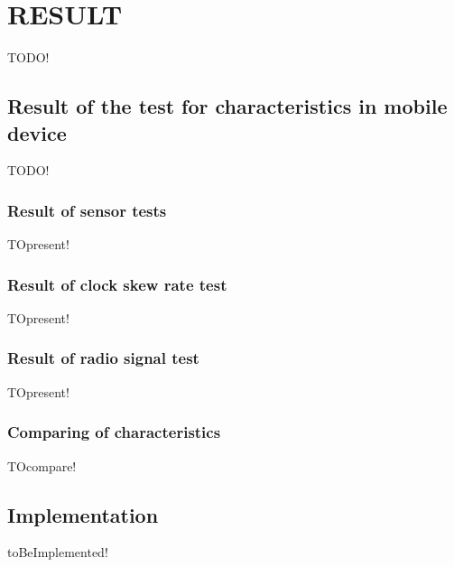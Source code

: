 \chapter{RESULT}\label{cha:result}
TODO!

\section{Result of the test for characteristics in mobile device}\label{sec:result}
TODO!
\subsection{Result of sensor tests}
TOpresent!
\subsection{Result of clock skew rate test}
TOpresent!
\subsection{Result of radio signal test}
TOpresent!
\subsection{Comparing of characteristics}
TOcompare!

\section{Implementation}\label{sec:implement}
toBeImplemented!